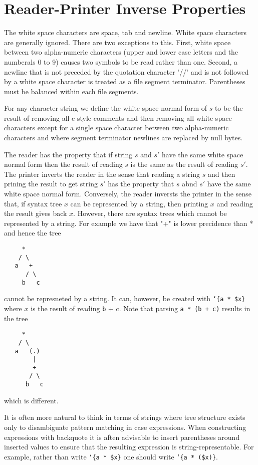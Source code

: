 \documentclass{article}
\newcommand{\mtt}[1]{\mbox{\tt #1}}
\begin{document}
\section{Reader-Printer Inverse Properties}

The white space characters are space, tab and newline.  White space characters are generally ignored.  There are two exceptions to this.
First, white space between two alpha-numeric characters (upper and lower case letters and the numberals 0 to 9) causes two symbols to be read rather than one.
Second, a newline that is not preceded by the quotation character '//' and is not followed by a white space character is
treated as a file segment terminator.  Parentheses must be balanced within each file segments.

For any character string we define the white space normal form of $s$
to be the result of removing all c-style comments and then removing all white space characters except for
a single space character between two alpha-numeric characters and where segment terminator newlines
are replaced by null bytes.

The reader has the property that if string $s$ and $s'$ have the same white space normal form then the result of reading
$s$ is the same as the result of reading $s'$.  The printer inverts the reader
in the sense that reading a string $s$ and then prining the result to get string $s'$ has the property that $s$ abnd $s'$ have the same white space normal form.
Conversely, the reader inversts the printer in the sense that, if syntax tree $x$ can be represented by a string, then printing $x$ and reading the result gives back $x$.
However, there are syntax trees which cannot be represented by a string.  For example we have that "+" is lower precidence than * and hence the tree
\begin{verbatim}
     *
    / \
   a   +
      / \
     b   c
\end{verbatim}
cannot be represneted by a string. It can, however, be created with {\tt `\{a * \$x\}} where $x$ is the result of reading {\mtt b + c}.
Note that parsing {\tt a * (b + c)} results in the tree
\begin{verbatim}
     *
    / \
   a   (.)
        |
        +
       / \
      b   c
\end{verbatim}
which is different.

It is often more natural to think in terms of strings where tree structure exists only to disambiguate
pattern matching in case expressions.  When constructing expressions with backquote it is aften advisable to insert
parentheses around inserted values to ensure that the resulting expression is string-representable.  For example,
rather than write {\tt `\{a * \$x\}} one should write {\tt `\{a * (\$x)\}}.
\end{document}
